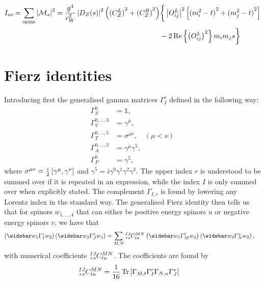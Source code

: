 \documentclass[english,notitlepage]{article}
\begin{document}
\begin{subequations}
    \begin{align} \nonumber
        I_{ss} = \sum_\text{spins} \left|\mathcal{M}_s\right|^2 = \frac{g^4}{c_W^2} \left|D_Z(s)\right|^2 \left({(C_Z^L)}^2+{(C_Z^R)}^2\right) & \bigg\{ \left|O_{ij}^L\right|^2 \left[ {(m_i^2-t)}^2 + {(m_j^2-t)}^2 \right] \\
                                                                                                                     & - 2\operatorname{Re}\left\{\left(O_{ij}^L\right)^2\right\} m_i m_j s \bigg\}
    \end{align}
\end{subequations}


\section{Fierz identities}
    Introducing first the generalised gamma matrices \(\Gamma_I^r\) defined in the following way:
    \begin{subequations}
        \begin{align}
            \Gamma_S^0            & = \mathbb{1},                        \\
            \Gamma_V^{0,\ldots,3} & = \gamma^\mu,                        \\
            \Gamma_T^{0,\ldots,5} & = \sigma^{\mu\nu}, \quad (\mu < \nu) \\
            \Gamma_A^{0,\ldots,3} & = \gamma^\mu \gamma^5,               \\
            \Gamma_P^0            & = \gamma^5,
        \end{align}
    \end{subequations}
    where \(\sigma^{\mu\nu} = \frac{i}{2} \left[\gamma^\mu, \gamma^\nu\right]\) and \(\gamma^5 = i \gamma^0 \gamma^1 \gamma^2 \gamma^3\). The upper index \(r\) is understood to be summed over if it is repeated in an expression, while the index \(I\) is only summed over when explicitly stated. The complement \(\Gamma_{I,r}\) is found by lowering any Lorentz index in the standard way.
    The generalised Fierz identity then tells us that for spinors \(w_{1,\ldots,4}\) that can either be positive energy spinors \(u\) or negative energy spinors \(v\), we have that
    \begin{align}
        \pclosed{\wbar{w}_1 \Gamma_I^r w_2} \pclosed{\wbar{w}_3 \Gamma_{J}^s w_4} & = \sum_{M,N} \tensor*[^{IJ}_{rs}]{C}{^{MN}_{tu}} \pclosed{\wbar{w}_1 \Gamma_M^t w_4} \pclosed{\wbar{w}_3 \Gamma_N^u w_2},
    \end{align}
    with numerical coefficients \(\tensor*[^{IJ}_{rs}]{C}{^{MN}_{tu}}\). The coefficients are found by
    \begin{align}
        \tensor*[^{IJ}_{rs}]{C}{^{MN}_{tu}} & = \frac{1}{16} \tr\bclosed{\Gamma_{M,t} \Gamma_I^r \Gamma_{N,u} \Gamma_J^{s}}
    \end{align}
\end{document}
